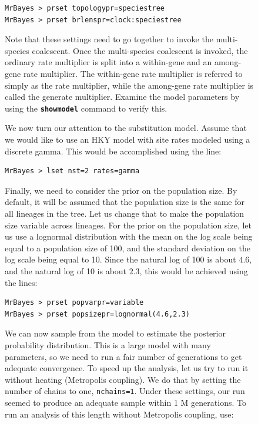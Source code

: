 \documentclass[12pt]{book}
\newcommand{\ttt}[1]{\texttt{#1}}
\newcommand{\tb}[1]{\ttt{\textbf{#1}}}
\begin{document}
\begin{figure}[h]
\begin{singlespacing}
\small
\begin{verbatim}
MrBayes > prset topologypr=speciestree
MrBayes > prset brlenspr=clock:speciestree
\end{verbatim}
\end{singlespacing}
\normalsize

Note that these settings need to go together to invoke the multi-species coalescent. Once the
multi-species coalescent is invoked, the ordinary rate multiplier is split into a within-gene and
an among-gene rate multiplier. The within-gene rate multiplier is referred to simply as the rate
multiplier, while the among-gene rate multiplier is called the generate multiplier. Examine the
model parameters by using the \tb{showmodel} command to verify this.

We now turn our attention to the substitution model. Assume that we would like to use an HKY model
with site rates modeled using a discrete gamma. This would be accomplished using the line:

\begin{singlespacing}
\small
\begin{verbatim}
MrBayes > lset nst=2 rates=gamma
\end{verbatim}
\end{singlespacing}
\normalsize

Finally, we need to consider the prior on the population size. By default, it will be assumed that
the population size is the same for all lineages in the tree. Let us change that to make the
population size variable across lineages. For the prior on the population size, let us use a
lognormal distribution with the mean on the log scale being equal to a population size of 100, and
the standard deviation on the log scale being equal to 10. Since the natural log of 100 is about
$4.6$, and the natural log of 10 is about $2.3$, this would be achieved using the lines:

\begin{singlespacing}
\small
\begin{verbatim}
MrBayes > prset popvarpr=variable
MrBayes > prset popsizepr=lognormal(4.6,2.3)
\end{verbatim}
\end{singlespacing}
\normalsize

We can now sample from the model to estimate the posterior probability distribution. This is a
large model with many parameters, so we need to run a fair number of generations to get adequate
convergence. To speed up the analysis, let us try to run it without heating (Metropolis coupling).
We do that by setting the number of chains to one, \ttt{nchains=1}. Under these settings, our
run seemed to produce an adequate sample within 1 M generations. To run an analysis of this length
without Metropolis coupling, use:


\end{figure}
\end{document}
